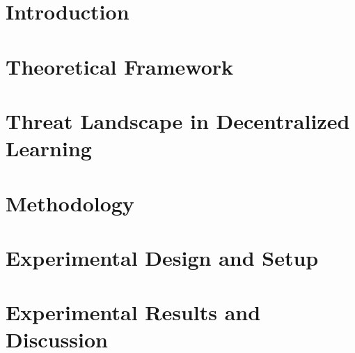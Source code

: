 \documentclass[a4paper, 11pt, showtrims]{memoir}
\begin{document}
\cleardoublepage
 
 
\openany
{}
\begin{KeepFromToc}
  \tableofcontents
\end{KeepFromToc}
\clearpage
\listoffigures
\clearpage
\listoftables
\clearpage
\listofalgorithms
\openright
 
 
\cleardoublepage
\mainmatter
\pagestyle{ruled}

\chapter{Introduction} \label{ch:introduction}
 
\cleardoublepage

\chapter{Theoretical Framework} \label{ch:theoretical framework}

\cleardoublepage

\chapter{Threat Landscape in Decentralized Learning} \label{ch:threat landscape}
 
\cleardoublepage

\chapter{Methodology} \label{ch:methodology}
 
\cleardoublepage

\chapter{Experimental Design and Setup}
\label{ch:experimentation}

\cleardoublepage

\chapter{Experimental Results and Discussion} \label{ch:results}
 
\cleardoublepage
\end{document}
